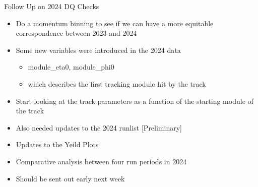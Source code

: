 \begin{frame}{Follow Up on 2024 DQ Checks}
    \begin{itemize}
        \item Do a momentum binning to see if we can have a more equitable correspondence between 2023 and 2024
        \item Some new variables were introduced in the 2024 data
        \begin{itemize}
            \item module\_eta0, module\_phi0 
            \item which describes the first tracking module hit by the track
        \end{itemize}
    \item Start looking at the track parameters as a function of the starting module of the track
    \item Also needed updates to the 2024 runlist [Preliminary]
    \item Updates to the Yeild Plots 
    \item Comparative analysis between four run periods in 2024
    \item Should be sent out early next week
    \end{itemize}
\end{frame}

